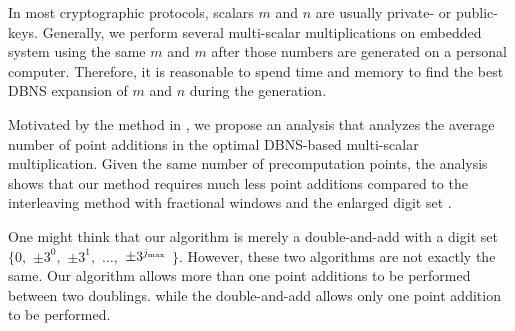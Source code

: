 In most cryptographic protocols, scalars $m$ and $n$ are usually private- or public-keys.
Generally, we perform several multi-scalar multiplications on embedded system using the same $m$ and $m$ after those numbers are generated on a personal computer.
Therefore, it is reasonable to spend time and memory to find the best DBNS expansion of $m$ and $n$ during the generation.

Motivated by the method in \cite{analysisMethod},
we propose an analysis that analyzes the average number of point additions in the optimal DBNS-based multi-scalar multiplication.
Given the same number of precomputation points, the analysis shows that our method requires much less point additions compared to
the interleaving method with fractional windows \cite{fractional} and the enlarged digit set \cite{analysisMethod}.

One might think that our algorithm is merely a double-and-add with a digit set $\{0,$ $\pm 3^0,$ $\pm 3^1,$ $\dots,$ $\pm 3^{j_{\rm max}}$ $\}$.
However, these two algorithms are not exactly the same.
Our algorithm allows more than one point additions to be performed between two doublings.
while the double-and-add allows only one point addition to be performed.

